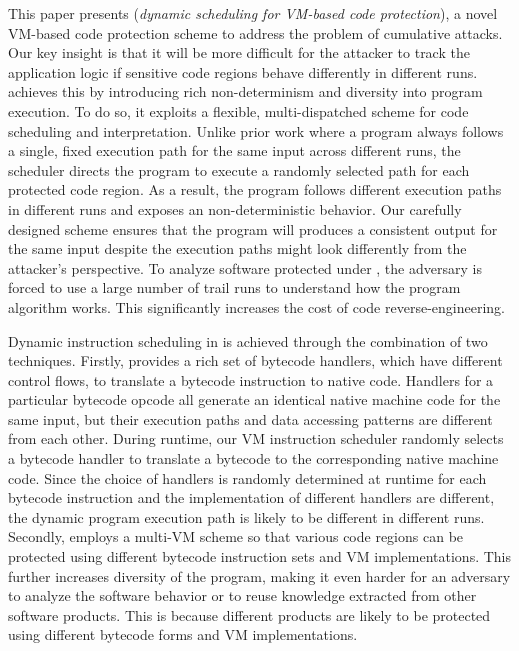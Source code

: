 This paper presents \DSVMP (\emph{dynamic scheduling for VM-based code
protection}), a novel VM-based code protection scheme to address the problem
of cumulative attacks. Our key insight is that it will be more difficult for
the attacker to track the application logic if sensitive code regions behave differently
in different runs. \DSVMP achieves this by introducing rich non-determinism and
diversity into program execution. To do so, it exploits a flexible,
multi-dispatched scheme for code scheduling and interpretation. Unlike prior
work where a program always follows a single, fixed execution path for the
same input across different runs, the \DSVMP scheduler directs the program to
execute a randomly selected path for each protected code region. As a
result, the program follows different execution paths in different runs and
exposes an non-deterministic behavior. Our carefully designed scheme ensures that
the program will produces a consistent output for the same input despite
the execution paths might look differently from the attacker's perspective. To
analyze software protected under \DSVMP, the adversary is forced to use a
large number of trail runs to understand how the program algorithm works.
This significantly increases the cost of code reverse-engineering.


Dynamic instruction scheduling in \DSVMP is achieved through the combination of two techniques.
Firstly, \DSVMP
provides a rich set of bytecode handlers, which have different control flows,
to translate a bytecode instruction to native code.
Handlers for a particular bytecode opcode  all generate an identical native machine code for the same input,
but their execution paths and data accessing patterns are different from each other.
During runtime, our VM instruction scheduler randomly selects a  bytecode handler
to translate a bytecode to the corresponding native machine code.
Since the choice of handlers is randomly determined at runtime for each bytecode
instruction and the implementation of different handlers are different,
the dynamic program execution path is likely to be different in different runs.
Secondly, \DSVMP employs a multi-VM scheme so that various code regions
can be protected using different bytecode instruction sets and VM implementations.
This further increases diversity of the program, making it even harder for an adversary to analyze
the software behavior or to reuse knowledge extracted from other software products.
 This is because different products are likely to be protected using different bytecode forms and VM implementations.


